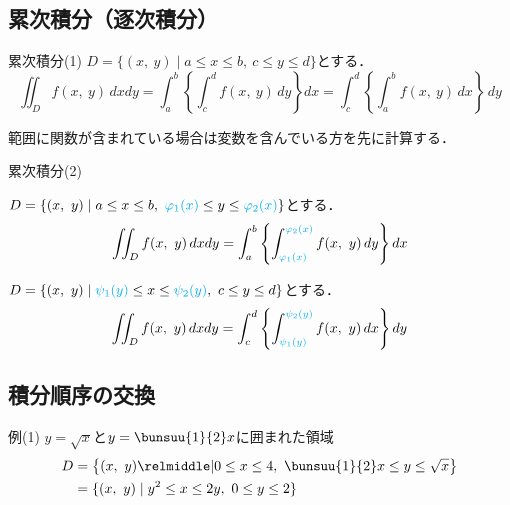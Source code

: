 \subsection{累次積分（逐次積分）}

\begin{kousiki}{累次積分(1)}
	$D = \{(x,\ y) \mid a \le x \le b,\ c \le y \le d\}$とする．
	\begin{equation}
		\iint_{D} f(x,\ y)\,dxdy = \int_{a}^{b} \left\{\int_{c}^{d} f(x,\ y)\,dy\right\}dx = \int_{c}^{d} \left\{\int_{a}^{b} f(x,\ y)\,dx\right\}\,dy
	\end{equation}
\end{kousiki}

範囲に関数が含まれている場合は変数を含んでいる方を先に計算する．
\begin{kousiki}{累次積分(2)}
	\begin{enumerate}[label=\textbf{[\arabic*]}, labelsep=10pt, leftmargin=23pt]
		\item $D = \{(x,\ y) \mid a \le x \le b,\ {\color{cyan}\varphi_1(x)} \le y \le {\color{cyan}\varphi_2(x)}\}$とする．
			\begin{equation}
				\iint_{D} f(x,\ y)\,dxdy = \int_{a}^{b} \left\{\int_{\textcolor{cyan}{\varphi_1(x)}}^{\textcolor{cyan}{\varphi_2(x)}} f(x,\ y)\,dy\right\}dx
			\end{equation}
		\item $D = \{(x,\ y) \mid {\color{cyan}\psi_1(y)} \le x \le {\color{cyan}\psi_2(y)},\ c \le y \le d\}$とする．
			\begin{equation}
				\iint_{D} f(x,\ y)\,dxdy = \int_{c}^{d} \left\{\int_{\textcolor{cyan}{\psi_1(y)}}^{\textcolor{cyan}{\psi_2(y)}} f(x,\ y)\,dx\right\}dy
			\end{equation}
	\end{enumerate}
\end{kousiki}



\subsection{積分順序の交換}

\begin{tip}{例(1)}
	$y = \sqrt{x}$と$y = \bunsuu{1}{2}x$に囲まれた領域
	\tcblower
	\begin{align*}
		D &= \left\{(x,\ y) \relmiddle| 0 \le x \le 4,\ \bunsuu{1}{2}x \le y \le \sqrt{x}\right\}\\
		&= \{(x,\ y) \mid y^2 \le x \le 2y,\ 0 \le y \le 2\}
	\end{align*}
\end{tip}

